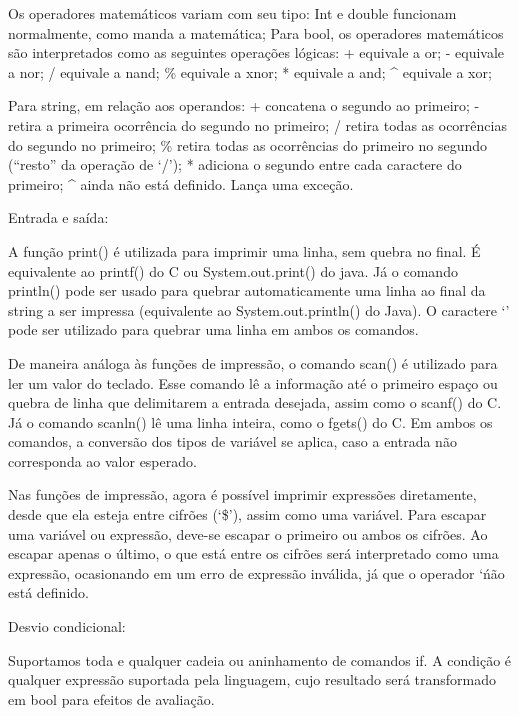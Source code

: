 \documentclass[12pt,a4paper]{article}
\begin{document}
Os operadores matemáticos variam com seu tipo:
Int e double funcionam normalmente, como manda a matemática;
Para bool, os operadores matemáticos são interpretados como as seguintes operações lógicas:
+ equivale a or;
- equivale a nor;
/ equivale a nand;
\% equivale a xnor;
* equivale a and;
^ equivale a xor;

Para string, em relação aos operandos:
+ concatena o segundo ao primeiro;
- retira a primeira ocorrência do segundo no primeiro;
/ retira todas as ocorrências do segundo no primeiro;
\% retira todas as ocorrências do primeiro no segundo (``resto'' da operação de `/');
* adiciona o segundo entre cada caractere do primeiro;
^ ainda não está definido. Lança uma exceção.


Entrada e saída:

A função print() é utilizada para imprimir uma linha, sem quebra no final. É equivalente ao printf() do C ou System.out.print() do java. Já o comando println() pode ser usado para quebrar automaticamente uma linha ao final da string a ser impressa (equivalente ao System.out.println() do Java). O caractere `\n' pode ser utilizado para quebrar uma linha em ambos os comandos.

De maneira análoga às funções de impressão, o comando scan() é utilizado para ler um valor do teclado. Esse comando lê a informação até o primeiro espaço ou quebra de linha que delimitarem a entrada desejada, assim como o scanf() do C. Já o comando scanln() lê uma linha inteira, como o fgets() do C. Em ambos os comandos, a conversão dos tipos de variável se aplica, caso a entrada não corresponda ao valor esperado.

Nas funções de impressão, agora é possível imprimir expressões diretamente, desde que ela esteja entre cifrões (`\$'), assim como uma variável. Para escapar uma variável ou expressão, deve-se escapar o primeiro ou ambos os cifrões. Ao escapar apenas o último, o que está entre os cifrões será interpretado como uma expressão, ocasionando em um erro de expressão inválida, já que o operador `\' não está definido.


Desvio condicional:

Suportamos toda e qualquer cadeia ou aninhamento de comandos if. A condição é qualquer expressão suportada pela linguagem, cujo resultado será transformado em bool para efeitos de avaliação.
\end{document}
